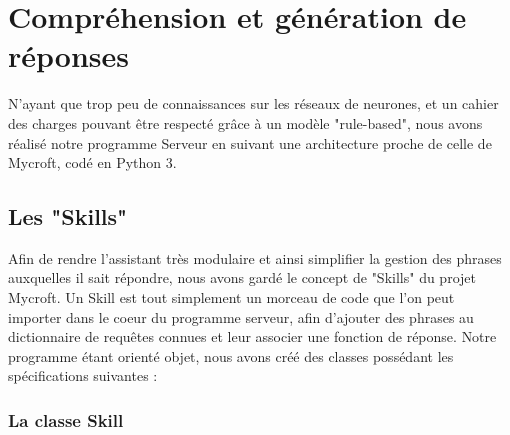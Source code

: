 \documentclass[a4paper,10pt]{report}
\begin{document}
      \section{Compréhension et génération de réponses}
      {N'ayant que trop peu de connaissances sur les réseaux de neurones, et un cahier des charges pouvant être respecté grâce à un modèle "rule-based", nous avons réalisé notre programme Serveur en suivant une architecture proche de celle de Mycroft, codé en Python 3.}
        \subsection{Les "Skills"}
        {Afin de rendre l'assistant très modulaire et ainsi simplifier la gestion des phrases auxquelles il sait répondre, nous avons gardé le concept de "Skills" du projet Mycroft. Un Skill est tout simplement un morceau de code que l'on peut importer dans le coeur du programme serveur, afin d'ajouter des phrases au dictionnaire de requêtes connues et leur associer une fonction de réponse.\newline}
        {Notre programme étant orienté objet, nous avons créé des classes possédant les spécifications suivantes :\newline\newline}

        \subsubsection{La classe Skill}
\end{document}
